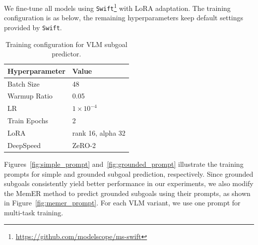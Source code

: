 We fine-tune all models using \texttt{Swift}\footnote{\url{https://github.com/modelscope/ms-swift}} with LoRA adaptation. The training configuration is as below, the remaining hyperparameters keep default settings provided by \texttt{Swift}.
\begin{table}[h]
\centering
\caption{Training configuration for VLM subgoal predictor.}
\label{tab:train_hparams_vlm}
\small
\begin{tabular}{ll}
\toprule
\textbf{Hyperparameter} & \textbf{Value} \\
\midrule
Batch Size  & 48 \\
Warmup Ratio & 0.05 \\
LR & $1\times 10^{-4}$ \\
Train Epochs & 2 \\
LoRA & rank 16, alpha 32 \\
DeepSpeed & ZeRO-2 \\
\bottomrule
\end{tabular}
\end{table}

Figures~\ref{fig:simple_prompt} and~\ref{fig:grounded_prompt} illustrate the training prompts for simple and grounded subgoal prediction, respectively. Since grounded subgoals consistently yield better performance in our experiments, we also modify the MemER\cite{sridhar2025memer} method to predict grounded subgoals using their prompts, as shown in Figure~\ref{fig:memer_prompt}. For each VLM variant, we  use one prompt for multi-task training.

\clearpage

